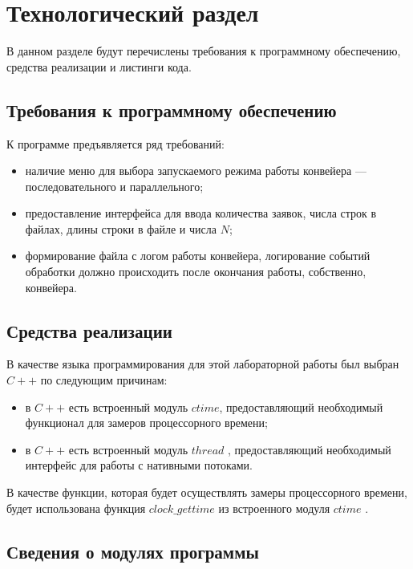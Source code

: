 \chapter{Технологический раздел}

В данном разделе будут перечислены требования к программному обеспечению, средства реализации и листинги кода.

\section{Требования к программному обеспечению}

К программе предъявляется ряд требований:

\begin{itemize} [label=--]
	\item наличие меню для выбора запускаемого режима работы конвейера --- последовательного и параллельного;
	\item предоставление интерфейса для ввода количества заявок, числа строк в файлах, длины строки в файле и числа $N$;
	\item формирование файла с логом работы конвейера, логирование событий обработки должно происходить после окончания работы, собственно, конвейера.
\end{itemize}

\section{Средства реализации}

В качестве языка программирования для этой лабораторной работы был выбран $C++$ \cite{pl} по следующим причинам:

\begin{itemize}[label=--]
	\item в $C++$ есть встроенный модуль $ctime$, предоставляющий необходимый функционал для замеров процессорного времени;
	\item в $C++$ есть встроенный модуль $thread$ \cite{info_thread}, предоставляющий необходимый интерфейс для работы с нативными потоками.
\end{itemize}

В качестве функции, которая будет осуществлять замеры процессорного времени, будет использована функция $clock\_gettime$ из встроенного модуля $ctime$ \cite{cpu_time_func}.

\section{Сведения о модулях программы}

